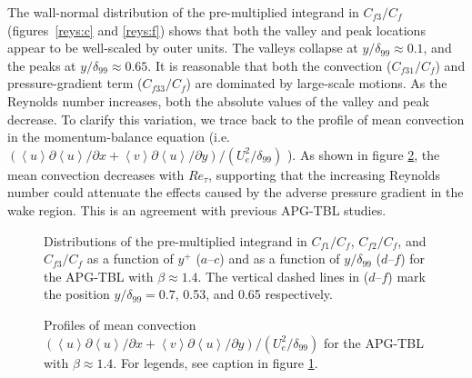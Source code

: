 The wall-normal distribution of the pre-multiplied integrand in $C_{f3}/C_f$ (figures~\ref{reys:c} and \ref{reys:f}) shows that both the valley and peak locations appear to be well-scaled by outer units. The valleys collapse at $y/\delta_{99}\approx0.1$, and the peaks at $y/\delta_{99}\approx0.65$.
It is reasonable that both the convection ($C_{f31}/C_f$) and pressure-gradient term ($C_{f33}/C_f$) are dominated by large-scale motions. 
{\color{black}
As the Reynolds number increases, both the absolute values of the valley and peak decrease. To clarify this variation, we trace back to the profile of mean convection in the momentum-balance equation (i.e. $( \left<u\right>{\partial\left<u\right>}/{\partial x}+\left<v\right>{\partial\left<u\right>}/{\partial y})/(U_e^2/\delta_{99})$ ). As shown in figure \ref{conv}, the mean convection decreases with $Re_\tau$, supporting that the increasing Reynolds number could attenuate the effects caused by the adverse pressure gradient in the wake region. This is an agreement with previous APG-TBL studies\cite{Vinuesa2018}.
}





\begin{figure}[htb]
\subfigure{\texttt{[image: 5a]} \label{reys:a}}
\subfigure{\texttt{[image: 5b]} \label{reys:b}}
\subfigure{\texttt{[image: 5c]} \label{reys:c}}
\subfigure{\texttt{[image: 5d]} \label{reys:d}}
\subfigure{\texttt{[image: 5e]} \label{reys:e}}
\subfigure{\texttt{[image: 5f]} \label{reys:f}}
\caption{Distributions of the pre-multiplied integrand in $C_{f1}/C_f$, $C_{f2}/C_f$, and $C_{f3}/C_f$ as a function of $y^+$ ($a$--$c$) and as a function of  $y/\delta_{99}$  ($d$--$f$)  for the APG-TBL with $\beta\approx1.4$. The vertical dashed lines in ($d$--$f$) mark the position $y/\delta_{99}=0.7$, 0.53, and 0.65 respectively.}
\label{reys}
\end{figure}


\begin{figure}
\centering
\subfigure{\texttt{[image: 6]}}
\caption{{\color{black}Profiles of mean convection $(\left<u\right>{\partial\left<u\right>}/{\partial x}+\left<v\right>{\partial\left<u\right>}/{\partial y})/(U_e^2/\delta_{99})$ for the APG-TBL with $\beta\approx1.4$. For legends, see caption in figure \ref{reys}.}}
\label{conv}
\end{figure}

